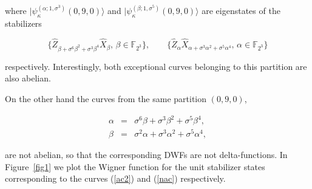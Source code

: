 \documentclass[quantumrep,article,submit,pdftex,moreauthors]{Definitions/mdpi}
\begin{document}
where $|\psi_{\kappa}^{(\alpha ; 1,\sigma^{3})}(0,9,0)\rangle$ and
$|\psi_{\kappa }^{(\beta ; 1,\sigma^{5})}(0,9,0)\rangle$ are eigenstates of the
stabilizers 

\begin{equation*}
	\{\hat{Z}_{\beta +\sigma ^{6}\beta ^{2}+\sigma^{3}\beta^{4}}
\hat{X}_{\beta }, \, \beta \in \mathbb{F}_{2^{3}}\},
\qquad \{\hat{Z}_{\alpha } \hat{X}_{\alpha + \sigma^{3}\alpha^{2} +
	\sigma^{5}\alpha^{4}}, \, \alpha \in
\mathbb{F}_{2^{3}}\}
\end{equation*}

respectively. Interestingly, both exceptional curves
belonging to this partition are also abelian.

On the other hand the curves from the same partition $(0,9,0)$,

\begin{eqnarray}
  \alpha &=&\sigma^{6}\beta +\sigma ^{3}\beta ^{2}+\sigma ^{5}\beta ^{4},
  \label{nac1} \\
  \beta &=&\sigma^{2}\alpha +\sigma ^{3}\alpha ^{2}+\sigma ^{5}\alpha ^{4},
  \label{nac}
\end{eqnarray}

are not abelian, so that the corresponding DWFs are not delta-functions. In
Figure~\ref{fig1} we plot the Wigner function for the unit stabilizer states
corresponding to the curves (\ref{ac2}) and (\ref{nac}) respectively.
\end{document}
